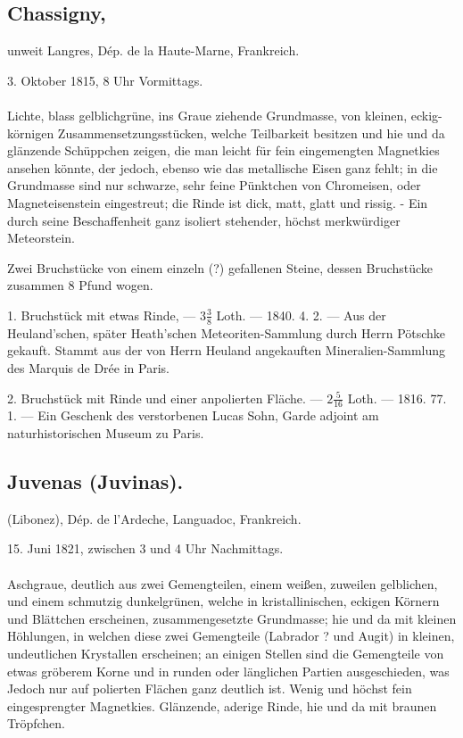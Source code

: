 \documentclass[a4paper, 11pt, oneside, polutonikogreek, german]{article}
\begin{document}
\subsection[Chassigny.]{Chassigny,}
\begin{center}
\small
unweit Langres, Dép. de la Haute-Marne, Frankreich.

3. Oktober 1815, 8 Uhr Vormittags.
\end{center}
\paragraph{}
Lichte, blass gelblichgrüne, ins Graue ziehende Grundmasse, von kleinen, eckig-körnigen Zusammensetzungsstücken, welche Teilbarkeit besitzen und hie und da glänzende Schüppchen zeigen, die man leicht für fein eingemengten Magnetkies ansehen könnte, der jedoch, ebenso wie das metallische Eisen ganz fehlt; in die Grundmasse sind nur schwarze, sehr feine Pünktchen von Chromeisen, oder Magneteisenstein eingestreut; die Rinde ist dick, matt, glatt und rissig. - Ein durch seine Beschaffenheit ganz isoliert stehender, höchst merkwürdiger Meteorstein.

Zwei Bruchstücke von einem einzeln (?) gefallenen Steine, dessen Bruchstücke zusammen 8 Pfund wogen.

1. Bruchstück mit etwas Rinde, — $3\frac{3}{8}$ Loth. — 1840. 4. 2. — Aus der Heuland’schen, später Heath’schen Meteoriten-Sammlung durch Herrn Pötschke gekauft. Stammt aus der von Herrn Heuland angekauften Mineralien-Sammlung des Marquis de Drée in Paris.

2. Bruchstück mit Rinde und einer anpolierten Fläche. — $2\frac{5}{16}$ Loth. — 1816. 77. 1. — Ein Geschenk des verstorbenen Lucas Sohn, Garde adjoint am naturhistorischen Museum zu Paris.
\subsection{Juvenas (Juvinas).}
\begin{center}
\small
(Libonez), Dép. de l'Ardeche, Languadoc, Frankreich.

15. Juni 1821, zwischen 3 und 4 Uhr Nachmittags.
\end{center}
\paragraph{}
Aschgraue, deutlich aus zwei Gemengteilen, einem weißen, zuweilen gelblichen, und einem schmutzig dunkelgrünen, welche in kristallinischen, eckigen Körnern und Blättchen erscheinen, zusammengesetzte Grundmasse; hie und da mit kleinen Höhlungen, in welchen diese zwei Gemengteile (Labrador ? und Augit) in kleinen, undeutlichen Krystallen erscheinen; an einigen Stellen sind die Gemengteile von etwas gröberem Korne und in runden oder länglichen Partien ausgeschieden, was Jedoch nur auf polierten Flächen ganz deutlich ist. Wenig und höchst fein eingesprengter Magnetkies. Glänzende, aderige Rinde, hie und da mit braunen Tröpfchen.
\end{document}
